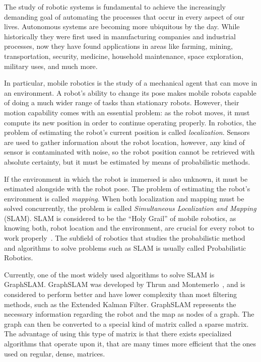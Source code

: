 The study of robotic systems is fundamental to achieve the increasingly demanding goal of automating the processes that occur in every aspect of our lives. Autonomous systems are becoming more ubiquitous by the day. While historically they were first used in manufacturing companies and industrial processes, now they have found applications in areas like farming, mining, transportation, security, medicine, household maintenance, space exploration, military uses, and much more.

In particular, mobile robotics is the study of a mechanical agent that can move in an environment. A robot's ability to change its pose makes mobile robots capable of doing a much wider range of tasks than stationary robots. However, their motion capability comes with an essential problem: as the robot moves, it must compute its new position in order to continue operating properly. In robotics, the problem of estimating the robot's current position is called \textit{localization}. Sensors are used to gather information about the robot location, however, any kind of sensor is contaminated with noise, so the robot position cannot be retrieved with absolute certainty, but it must be estimated by means of probabilistic methods.  


If the environment in which the robot is immersed is also unknown, it must be estimated alongside with the robot pose. The problem of estimating the robot's environment is called \textit{mapping}. When both localization and mapping must be solved concurrently, the problem is called \textit{Simultaneous Localization and Mapping} (SLAM). SLAM is considered to be the ``Holy Grail'' of mobile robotics, as knowing both, robot location and the environment, are crucial for every robot to work properly~\cite{holygrail}. The subfield of robotics that studies the probabilistic method and algorithms to solve problems such as SLAM is usually called Probabilistic Robotics.

Currently, one of the most widely used algorithms to solve SLAM is GraphSLAM. GraphSLAM was developed by Thrun and Montemerlo~\cite{graphslam}, and is considered to perform better and have lower complexity than most filtering methods, such as the Extended Kalman Filter. GraphSLAM represents the necessary information regarding the robot and the map as nodes of a graph. The graph can then be converted to a special kind of matrix called a sparse matrix. The advantage of using this type of matrix is that there exists specialized algorithms that operate upon it, that are many times more efficient that the ones used on regular, dense, matrices. 



